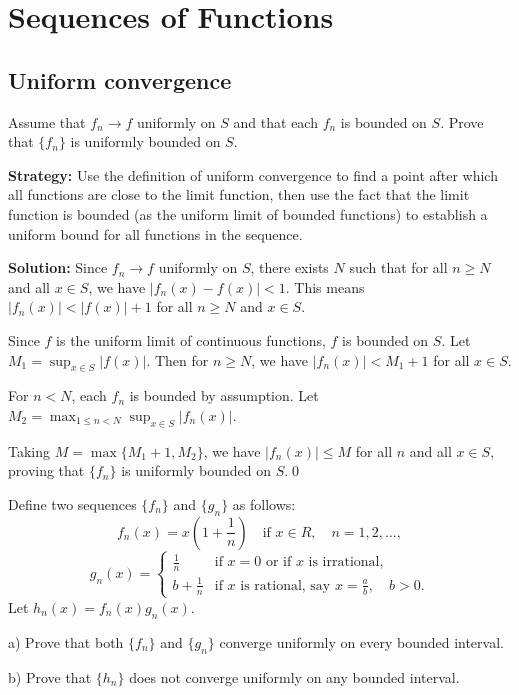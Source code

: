 \chapter{Sequences of Functions}

\section{Uniform convergence}


\begin{problembox}
\begin{problemstatement}
Assume that \( f_n \to f \) uniformly on \( S \) and that each \( f_n \) is bounded on \( S \). Prove that \(\{f_n\}\) is uniformly bounded on \( S \).
\end{problemstatement}
\end{problembox}

\noindent\textbf{Strategy:} Use the definition of uniform convergence to find a point after which all functions are close to the limit function, then use the fact that the limit function is bounded (as the uniform limit of bounded functions) to establish a uniform bound for all functions in the sequence.

\bigskip\noindent\textbf{Solution:} Since \( f_n \to f \) uniformly on \( S \), there exists \( N \) such that for all \( n \geq N \) and all \( x \in S \), we have \( |f_n(x) - f(x)| < 1 \). This means \( |f_n(x)| < |f(x)| + 1 \) for all \( n \geq N \) and \( x \in S \).

Since \( f \) is the uniform limit of continuous functions, \( f \) is bounded on \( S \). Let \( M_1 = \sup_{x \in S} |f(x)| \). Then for \( n \geq N \), we have \( |f_n(x)| < M_1 + 1 \) for all \( x \in S \).

For \( n < N \), each \( f_n \) is bounded by assumption. Let \\ \( M_2 = \max_{1 \leq n < N} \sup_{x \in S} |f_n(x)| \).

Taking \( M = \max\{M_1 + 1, M_2\} \), we have \( |f_n(x)| \leq M \) for all \( n \) and all \( x \in S \), proving that \(\{f_n\}\) is uniformly bounded on \( S \).\qed


\begin{problembox}
\begin{problemstatement}
Define two sequences \(\{f_n\}\) and \(\{g_n\}\) as follows:
\[f_n(x) = x \left( 1 + \frac{1}{n} \right) \quad \text{if } x \in R, \quad n = 1, 2, \ldots,\]
\[g_n(x) = 
\begin{cases}
\frac{1}{n} & \text{if } x = 0 \text{ or if } x \text{ is irrational,} \\
b + \frac{1}{n} & \text{if } x \text{ is rational, say } x = \frac{a}{b}, \quad b > 0.
\end{cases}\]
Let \( h_n(x) = f_n(x) g_n(x) \).

a) Prove that both \(\{f_n\}\) and \(\{g_n\}\) converge uniformly on every bounded interval.

b) Prove that \(\{h_n\}\) does not converge uniformly on any bounded interval.
\end{problemstatement}
\end{problembox}

